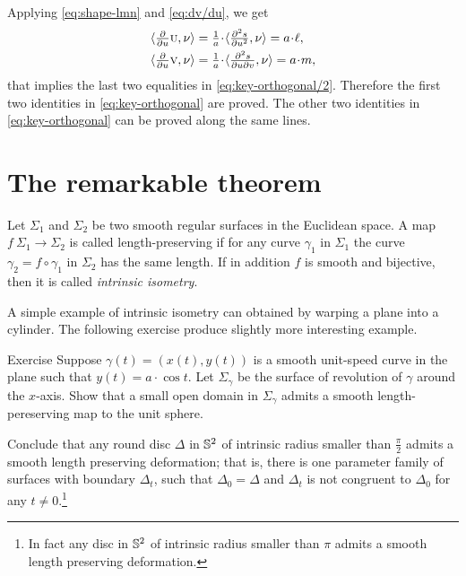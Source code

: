 Applying \ref{eq:shape-lmn} and \ref{eq:dv/du}, we get
\begin{align*}
\langle\tfrac{\partial}{\partial u}\vec u,\Norm\rangle
&=
\tfrac1{a}\cdot \langle\tfrac{\partial^2s}{\partial u^2},\Norm\rangle
=a\cdot \ell,
\\
\langle\tfrac{\partial}{\partial u}\vec v,\Norm\rangle
&=
\tfrac1{a}\cdot \langle\tfrac{\partial^2s}{\partial u\partial v},\Norm\rangle
=a\cdot m,
\end{align*}
that implies the last two equalities in \ref{eq:key-orthogonal/2}.
Therefore the first two identities in \ref{eq:key-orthogonal} are proved.
The other two identities in \ref{eq:key-orthogonal} can be proved along the same lines.
\qeds

\section*{The remarkable theorem}

Let $\Sigma_1$ and $\Sigma_2$ be two smooth regular surfaces in the Euclidean space.
A map $f\:\Sigma_1\to \Sigma_2$ is called  length-preserving if for any curve $\gamma_1$ in $\Sigma_1$ the curve $\gamma_2=f\circ\gamma_1$ in $\Sigma_2$ has the same length. %
If in addition $f$ is smooth and bijective, then it is called \emph{intrinsic isometry}. 

A simple example of intrinsic isometry can obtained by warping a plane into a cylinder.
The following exercise produce slightly more interesting example.

\begin{thm}{Exercise}\label{ex:deformation}
Suppose $\gamma(t)=(x(t),y(t))$ is a smooth unit-speed curve in the plane such that $y(t)=a\cdot \cos t$.
Let $\Sigma_\gamma$ be the surface of revolution of $\gamma$ around the $x$-axis.
Show that a small open domain in $\Sigma_\gamma$ admits a smooth length-pereserving map to the unit sphere.

Conclude that any round disc $\Delta$ in $\mathbb{S}^2$ of intrinsic radius smaller than $\tfrac\pi2$ admits a smooth length preserving deformation; that is, there is one parameter family of surfaces with boundary $\Delta_t$, such that $\Delta_0=\Delta$ and $\Delta_t$ is not congruent to $\Delta_0$ for any $t\ne0$.\footnote{In fact any disc in $\mathbb{S}^2$ of intrinsic radius smaller than $\pi$ admits a smooth length preserving deformation. %
}
\end{thm}


